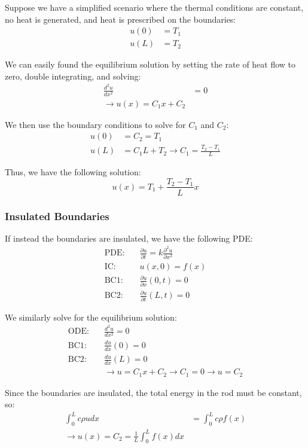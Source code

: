 \documentclass{article}
\begin{document}
Suppose we have a simplified scenario where the thermal conditions are constant, no heat is generated, and heat is prescribed on the boundaries:
\begin{align*}
    u(0)&=T_1 \\
    u(L)&=T_2
\end{align*}

We can easily found the equilibrium solution by setting the rate of heat flow to zero, double integrating, and solving:
\begin{align*}
    \frac{d^2u}{dx^2} &=0 \\
    \rightarrow u(x)=C_1x+C_2
\end{align*}

We then use the boundary conditions to solve for \(C_1\) and \(C_2\):
\begin{align*}
    u(0)&=C_2=T_1 \\
    u(L)&=C_1L+T_2 \rightarrow C_1=\frac{T_2-T_1}{L}
\end{align*}

Thus, we have the following solution:
\[
    u(x)=T_1+\frac{T_2-T_1}{L}x
\]

\subsubsection{Insulated Boundaries}

If instead the boundaries are insulated, we have the following PDE:
\[
    \begin{aligned}
        \text{PDE:} \quad & \frac{\partial u}{\partial t}=k\frac{\partial^2 u}{\partial x^2} \\
        \text{IC:} \quad & u(x,0)=f(x) \\
        \text{BC1:} \quad & \frac{\partial u}{\partial x}(0,t)=0 \\
        \text{BC2:} \quad & \frac{\partial u}{\partial t}(L,t)=0
    \end{aligned}
\]

We similarly solve for the equilibrium solution:
\[
    \begin{aligned}
        \text{ODE:} \quad & \frac{d^2 u}{dx^2}=0 \\
        \text{BC1:} \quad & \frac{du}{dx}(0)=0 \\
        \text{BC2:} \quad & \frac{du}{dx}(L)=0 \\
        &\rightarrow u=C_1x+C_2 \rightarrow C_1=0 \rightarrow u=C_2
    \end{aligned}
\]

Since the boundaries are insulated, the total energy in the rod must be constant, so:
\begin{align*}
    \int_0^L c\rho u dx&=\int_0^L c\rho f(x) \\
    \rightarrow u(x)=C_2=\frac{1}{L}\int_0^{L}f(x)dx
\end{align*}
\end{document}
